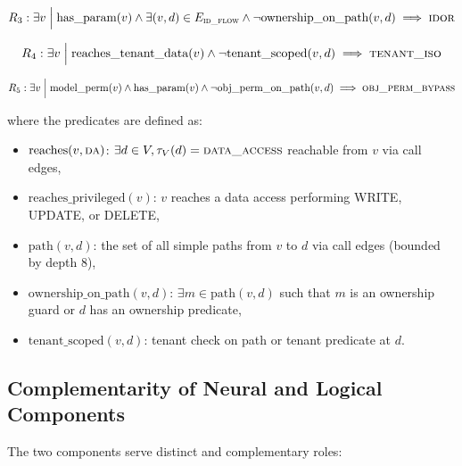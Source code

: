\begin{definition}
\begin{equation}
R_3: \exists v \;\Big|\; \text{has\_param}(v) \wedge \exists (v, d) \in E_{\textsc{id\_flow}} \wedge \neg\text{ownership\_on\_path}(v, d) \implies \textsc{idor}
\end{equation}
\end{definition}

\begin{definition}
\begin{equation}
R_4: \exists v \;\Big|\; \text{reaches\_tenant\_data}(v) \wedge \neg\text{tenant\_scoped}(v, d) \implies \textsc{tenant\_iso}
\end{equation}
\end{definition}

\begin{definition}
\begin{equation}
R_5: \exists v \;\Big|\; \text{model\_perm}(v) \wedge \text{has\_param}(v) \wedge \neg\text{obj\_perm\_on\_path}(v, d) \implies \textsc{obj\_perm\_bypass}
\end{equation}
\end{definition}

where the predicates are defined as:
\begin{itemize}
    \item $\text{reaches}(v, \textsc{da})$: $\exists d \in V, \tau_V(d) = \textsc{data\_access}$ reachable from $v$ via call edges,
    \item $\text{reaches\_privileged}(v)$: $v$ reaches a data access performing WRITE, UPDATE, or DELETE,
    \item $\text{path}(v, d)$: the set of all simple paths from $v$ to $d$ via call edges (bounded by depth 8),
    \item $\text{ownership\_on\_path}(v, d)$: $\exists m \in \text{path}(v, d)$ such that $m$ is an ownership guard or $d$ has an ownership predicate,
    \item $\text{tenant\_scoped}(v, d)$: tenant check on path or tenant predicate at $d$.
\end{itemize}

\subsection{Complementarity of Neural and Logical Components}

The two components serve distinct and complementary roles:

